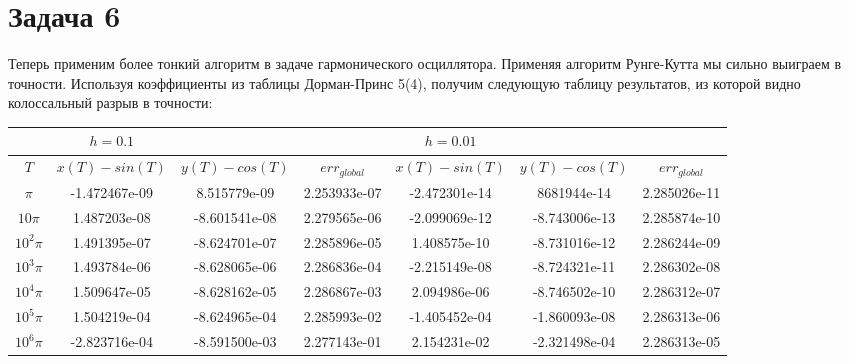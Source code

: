 \documentclass[a4paper,12pt]{article}
\begin{document}
  \newpage

  \section*{Задача 6}
  Теперь применим более тонкий алгоритм в задаче гармонического осциллятора.
  Применяя алгоритм Рунге-Кутта мы сильно выиграем в точности. Используя коэффициенты из таблицы Дорман-Принс 5(4), получим следующую таблицу результатов, из которой видно колоссальный разрыв в точности:
    \begin{table}[htb]
      \begin{center}
        \begin{tabular}{|c|c|c|c|c|c|c|}
			\hline
			&$h=0.1$&&&$h=0.01$&&\\
			\hline
			$T$&$x(T)-sin(T)$&$y(T)-cos(T)$&$err_{global}$&$x(T)-sin(T)$&$y(T)-cos(T)$&$err_{global}$\\
			\hline
			$\pi$&-1.472467e-09&8.515779e-09&2.253933e-07&-2.472301e-14&8681944e-14&2.285026e-11\\
			\hline
			$10\pi$&1.487203e-08&-8.601541e-08&2.279565e-06&-2.099069e-12&-8.743006e-13&2.285874e-10\\
			\hline
			$10^2\pi$&1.491395e-07&-8.624701e-07&2.285896e-05&1.408575e-10&-8.731016e-12&2.286244e-09\\
			\hline
			$10^3\pi$&1.493784e-06&-8.628065e-06&2.286836e-04&-2.215149e-08&-8.724321e-11&2.286302e-08\\
			\hline
			$10^4\pi$&1.509647e-05&-8.628162e-05&2.286867e-03&2.094986e-06&-8.746502e-10&2.286312e-07\\
			\hline
			$10^5\pi$&1.504219e-04&-8.624965e-04&2.285993e-02&-1.405452e-04&-1.860093e-08&2.286313e-06\\
			\hline
			$10^6\pi$&-2.823716e-04&-8.591500e-03&2.277143e-01&2.154231e-02&-2.321498e-04&2.286313e-05\\
			\hline
        \end{tabular}
      \end{center}
    \end{table}
    \FloatBarrier
\end{document}
